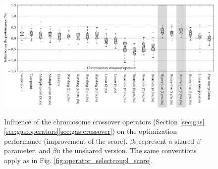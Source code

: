 \documentclass{ametsoc}
\begin{document}
\begin{figure}[t]
	\begin{center}
		\noindent\includegraphics[width=39pc,angle=0]{fig06.pdf}\\
	\end{center}
	\caption{Influence of the chromosome crossover operators (Section \ref{sec:gas}\ref{sec:gas:operators}\ref{sec:gas:crossover}) on the optimization performance (improvement of the score).  $\beta$s represent a shared $\beta$ parameter, and $\beta$u the unshared version. The same conventions apply as in Fig. \ref{fig:operator_selectcoupl_score}.}
	\label{fig:operator_crossover_score}
\end{figure}
\end{document}
